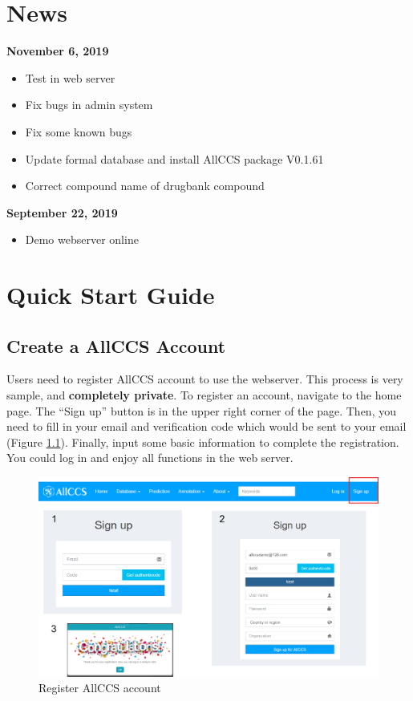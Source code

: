 \documentclass[12pt,]{book}
\providecommand{\tightlist}{%
  \setlength{\itemsep}{0pt}\setlength{\parskip}{0pt}}
\begin{document}
\chapter*{News}\label{news}

\textbf{November 6, 2019}

\begin{itemize}
\tightlist
\item
  Test in web server
\item
  Fix bugs in admin system
\item
  Fix some known bugs
\item
  Update formal database and install AllCCS package V0.1.61
\item
  Correct compound name of drugbank compound 
\end{itemize}

\textbf{September 22, 2019}

\begin{itemize}
\tightlist
\item
  Demo webserver online
\end{itemize}

\chapter{Quick Start Guide}\label{quick-start-guide}

\section{Create a AllCCS Account}\label{create-a-allccs-account}

Users need to register AllCCS account to use the webserver. This process
is very sample, and \textbf{completely private}. To register an account,
navigate to the home page. The ``Sign up'' button is in the upper right
corner of the page. Then, you need to fill in your email and
verification code which would be sent to your email (Figure
\ref{fig:FigRegister}). Finally, input some basic information to
complete the registration. You could log in and enjoy all functions in
the web server.

\begin{figure}

{\centering \includegraphics{images/chapter1/register_1} 

}

\caption{Register AllCCS account}\label{fig:FigRegister}
\end{figure}
\end{document}
